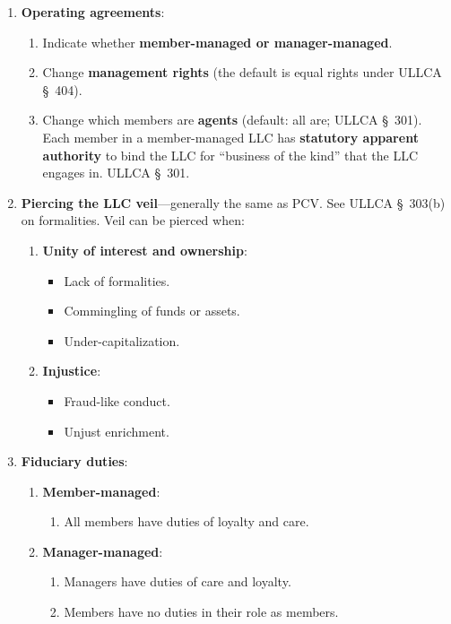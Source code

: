 \begin{enumerate}
\begin{enumerate}
\begin{enumerate}
        \end{enumerate}
        \item \textbf{Operating agreements}:
        \begin{enumerate}
            \item Indicate whether \textbf{member-managed or manager-managed}.
            \item Change \textbf{management rights} (the default is equal 
            rights under ULLCA \S\ 404).
            \item Change which members are \textbf{agents} (default: all are; 
            ULLCA \S\ 301). Each member in a member-managed LLC has 
            \textbf{statutory apparent authority} to bind the LLC for 
            ``business of the kind'' that the LLC engages in. ULLCA \S\ 301.
        \end{enumerate}
        \item \textbf{Piercing the LLC veil}---generally the same as PCV. See 
        ULLCA \S\ 303(b) on formalities. Veil can be pierced when:
        \begin{enumerate}
            \item \textbf{Unity of interest and ownership}:
            \begin{itemize}
                \item Lack of formalities.
                \item Commingling of funds or assets.
                \item Under-capitalization.
            \end{itemize}
            \item \textbf{Injustice}:
            \begin{itemize}
                \item Fraud-like conduct.
                \item Unjust enrichment.
            \end{itemize}
        \end{enumerate}
        \item \textbf{Fiduciary duties}:
        \begin{enumerate}
            \item \textbf{Member-managed}:
            \begin{enumerate}
                \item All members have duties of loyalty and care.
            \end{enumerate}
            \item \textbf{Manager-managed}:
            \begin{enumerate}
                \item Managers have duties of care and loyalty.
                \item Members have no duties in their role as members.
            \end{enumerate}
        \end{enumerate}
    \end{enumerate}
\end{enumerate}

